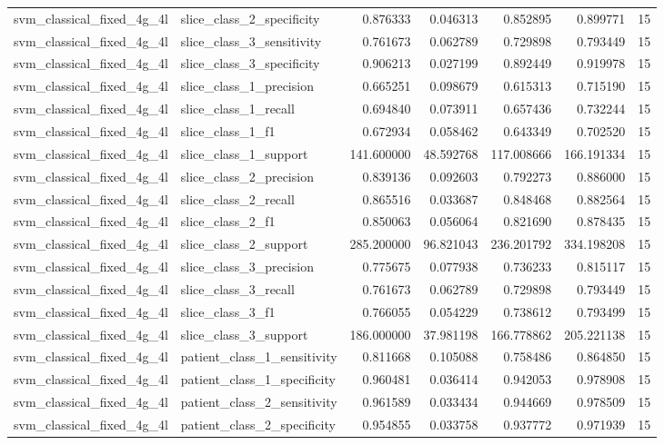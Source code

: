 \begin{tabular}{llrrrrr}
svm_classical_fixed_4g_4l & slice_class_2_specificity & 0.876333 & 0.046313 & 0.852895 & 0.899771 & 15 \\
svm_classical_fixed_4g_4l & slice_class_3_sensitivity & 0.761673 & 0.062789 & 0.729898 & 0.793449 & 15 \\
svm_classical_fixed_4g_4l & slice_class_3_specificity & 0.906213 & 0.027199 & 0.892449 & 0.919978 & 15 \\
svm_classical_fixed_4g_4l & slice_class_1_precision & 0.665251 & 0.098679 & 0.615313 & 0.715190 & 15 \\
svm_classical_fixed_4g_4l & slice_class_1_recall & 0.694840 & 0.073911 & 0.657436 & 0.732244 & 15 \\
svm_classical_fixed_4g_4l & slice_class_1_f1 & 0.672934 & 0.058462 & 0.643349 & 0.702520 & 15 \\
svm_classical_fixed_4g_4l & slice_class_1_support & 141.600000 & 48.592768 & 117.008666 & 166.191334 & 15 \\
svm_classical_fixed_4g_4l & slice_class_2_precision & 0.839136 & 0.092603 & 0.792273 & 0.886000 & 15 \\
svm_classical_fixed_4g_4l & slice_class_2_recall & 0.865516 & 0.033687 & 0.848468 & 0.882564 & 15 \\
svm_classical_fixed_4g_4l & slice_class_2_f1 & 0.850063 & 0.056064 & 0.821690 & 0.878435 & 15 \\
svm_classical_fixed_4g_4l & slice_class_2_support & 285.200000 & 96.821043 & 236.201792 & 334.198208 & 15 \\
svm_classical_fixed_4g_4l & slice_class_3_precision & 0.775675 & 0.077938 & 0.736233 & 0.815117 & 15 \\
svm_classical_fixed_4g_4l & slice_class_3_recall & 0.761673 & 0.062789 & 0.729898 & 0.793449 & 15 \\
svm_classical_fixed_4g_4l & slice_class_3_f1 & 0.766055 & 0.054229 & 0.738612 & 0.793499 & 15 \\
svm_classical_fixed_4g_4l & slice_class_3_support & 186.000000 & 37.981198 & 166.778862 & 205.221138 & 15 \\
svm_classical_fixed_4g_4l & patient_class_1_sensitivity & 0.811668 & 0.105088 & 0.758486 & 0.864850 & 15 \\
svm_classical_fixed_4g_4l & patient_class_1_specificity & 0.960481 & 0.036414 & 0.942053 & 0.978908 & 15 \\
svm_classical_fixed_4g_4l & patient_class_2_sensitivity & 0.961589 & 0.033434 & 0.944669 & 0.978509 & 15 \\
svm_classical_fixed_4g_4l & patient_class_2_specificity & 0.954855 & 0.033758 & 0.937772 & 0.971939 & 15 \\

\end{tabular}
